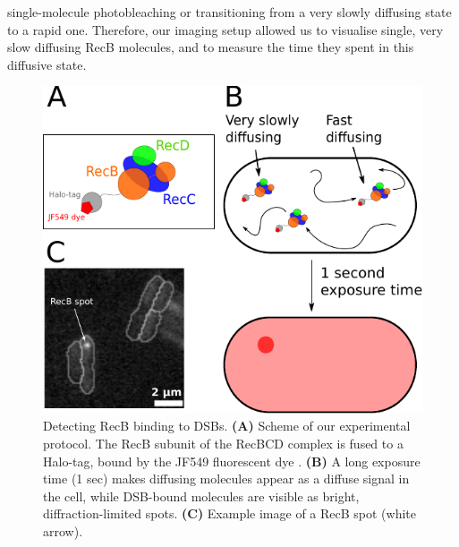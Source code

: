 single-molecule photobleaching or transitioning from a very slowly diffusing state to a rapid one. Therefore, our imaging setup allowed us to visualise single, very slow diffusing RecB molecules, and to measure the time they spent in this diffusive state.

\begin{figure}[htbp]
    \centering
    \includegraphics[width=.45\textwidth]{Figures/Fig1_Exp_principle.pdf}
    \caption{Detecting RecB binding to DSBs. \textbf{(A)} Scheme of our experimental protocol. The RecB subunit of the RecBCD complex is fused to a Halo-tag, bound by the JF549 fluorescent dye \cite{Lepore2019a, Lepore2025}. \textbf{(B)} A long exposure time (1 sec) makes diffusing molecules appear as a diffuse signal in the cell, while DSB-bound molecules are visible as bright, diffraction-limited spots. \textbf{(C)} Example image of a RecB spot (white arrow).}
    \label{Fig:exp_principle}
\end{figure}

